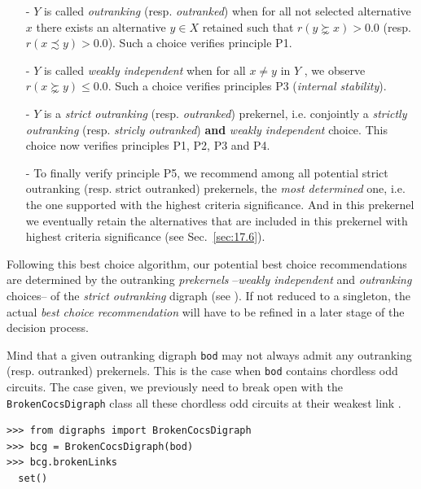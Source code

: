 \begin{itemize}[leftmargin=0.5cm,listparindent=0em]
\item [-] $Y$ is called \emph{outranking} (resp. \emph{outranked}) when for all not selected alternative $x$ there exists an alternative $y \in X$ retained such that $r(y \succnsim x) > 0.0$ (resp. $r(x \precsim y) > 0.0$). Such a choice verifies principle P1.
\item [-] $Y$ is called \emph{weakly independent} when for all $x \neq y$ in $Y$ , we observe $r(x \succnsim y) \leq 0.0$. Such a choice verifies principles P3 (\emph{internal stability}).
\item [-] $Y$ is a \emph{strict outranking} (resp. \emph{outranked}) prekernel, i.e. conjointly a \emph{strictly outranking} (resp. \emph{stricly outranked}) \textbf{and} \emph{weakly independent} choice. This choice now verifies principles P1, P2, P3 and P4.
\item [-] To finally verify principle P5, we recommend among all potential strict outranking (resp. strict outranked) prekernels, the \emph{most determined} one, i.e. the one supported with the highest criteria significance. And in this prekernel we eventually retain the alternatives that are included in this prekernel with highest criteria significance (see Sec.~\ref{sec:17.6}).
\end{itemize}

Following this best choice algorithm, our potential best choice recommendations are determined by the outranking \emph{prekernels} --\emph{weakly independent} and \emph{outranking} choices-- of the \emph{strict outranking} digraph (see \citet{BIS-2008a}). If not reduced to a singleton, the actual \emph{best choice recommendation} will have to be refined in a later stage of the decision process.

Mind that a given outranking digraph \texttt{bod} may not always admit any outranking (resp. outranked) prekernels. This is the case when \texttt{bod} contains chordless odd circuits. The case given, we previously need to break open with the \texttt{BrokenCocsDigraph} class all these chordless odd circuits at their weakest link \citep{BIS-2021b}.
\begin{lstlisting}
>>> from digraphs import BrokenCocsDigraph
>>> bcg = BrokenCocsDigraph(bod)
>>> bcg.brokenLinks
  set()
\end{lstlisting}

